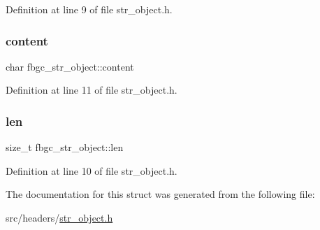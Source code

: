 Definition at line 9 of file str\+\_\+object.\+h.

\mbox{\label{structfbgc__str__object_af2e138bcfc159a80d8fa686d4aa45791}} 
\subsubsection{\texorpdfstring{content}{content}}
{\footnotesize\ttfamily char fbgc\+\_\+str\+\_\+object\+::content}



Definition at line 11 of file str\+\_\+object.\+h.

\mbox{\label{structfbgc__str__object_a6bcd23323579e758b1d497200d15f5bc}} 
\subsubsection{\texorpdfstring{len}{len}}
{\footnotesize\ttfamily size\+\_\+t fbgc\+\_\+str\+\_\+object\+::len}



Definition at line 10 of file str\+\_\+object.\+h.



The documentation for this struct was generated from the following file\+:\begin{DoxyCompactItemize}
\item 
src/headers/\hyperlink{str__object_8h}{str\+\_\+object.\+h}\end{DoxyCompactItemize}
